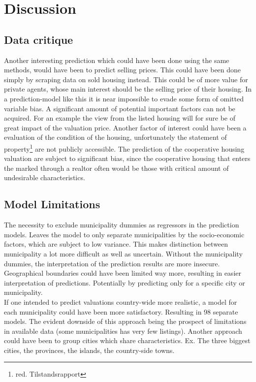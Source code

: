 \documentclass[12pt,a4paper]{article}
\begin{document}
\section{Discussion}
\subsection{Data critique}
Another interesting prediction which could have been done using the same methods, would have been to predict selling prices. This could have been done simply by scraping data on sold housing instead. This could be of more value for private agents, whose main interest should be the selling price of their housing. %
\newline 
In a prediction-model like this it is near impossible to evade some form of omitted variable bias. A significant amount of potential important factors can not be acquired. For an example the view from the listed housing will for sure be of great impact of the valuation price. Another factor of interest could have been a evaluation of the condition of the housing, unfortunately the statement of property\footnote{red. Tilstandsrapport} are not publicly accessible. \newline
The prediction of the cooperative housing valuation %
are subject to significant bias, since the cooperative housing that enters the marked through a realtor often would be those with critical amount of undesirable characteristics. 

\subsection{Model Limitations}
The necessity to exclude municipality dummies as regressors in the prediction models. Leaves the model to only separate municipalities by the socio-economic factors, which are subject to low variance. This makes distinction between municipality a lot more difficult as well as uncertain.   
Without the municipality dummies, the interpretation of the prediction results are more insecure. %
Geographical boundaries could have been limited way more, resulting in easier interpretation of predictions. Potentially by predicting only for a specific city or municipality. \\
If one intended to predict valuations country-wide more realistic, a model for each municipality could have been more satisfactory. Resulting in 98 separate models. The evident downside of this approach being the prospect of limitations in available data (some municipalities has very few listings).     
Another approach could have been to group cities which share characteristics. Ex. The three biggest cities, the provinces, the islands, the country-side towns.    
\end{document}
